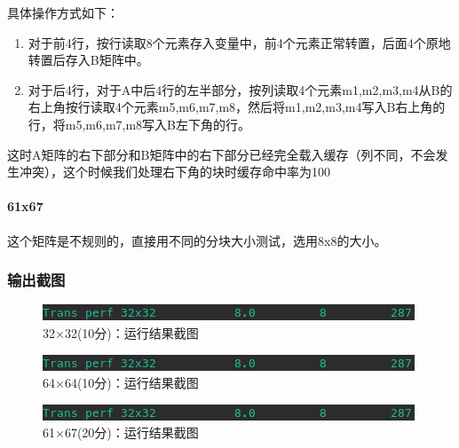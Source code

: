 具体操作方式如下：

\begin{enumerate}
    \item 对于前4行，按行读取8个元素存入变量中，前4个元素正常转置，后面4个原地转置后存入B矩阵中。
    \item 对于后4行，对于A中后4行的左半部分，按列读取4个元素m1,m2,m3,m4从B的右上角按行读取4个元素m5,m6,m7,m8，然后将m1,m2,m3,m4写入B右上角的行，将m5,m6,m7,m8写入B左下角的行。
\end{enumerate}

这时A矩阵的右下部分和B矩阵中的右下部分已经完全载入缓存（列不同，不会发生冲突），这个时候我们处理右下角的块时缓存命中率为100%

\paragraph{61x67}
这个矩阵是不规则的，直接用不同的分块大小测试，选用8x8的大小。

\subsubsection{输出截图}

\begin{figure}[H]
    \centering
    \includegraphics[width=0.7\linewidth]{figures/Trans_1}
    \caption{32×32(10分)：运行结果截图}
    \label{fig:trans1}
\end{figure}

\begin{figure}[H]
    \centering
    \includegraphics[width=0.7\linewidth]{figures/Trans_1}
    \caption{64×64(10分)：运行结果截图}
    \label{fig:trans2}
\end{figure}

\begin{figure}[H]
    \centering
    \includegraphics[width=0.7\linewidth]{figures/Trans_1}
    \caption{61×67(20分)：运行结果截图}
    \label{fig:trans3}
\end{figure}
